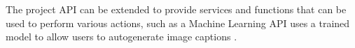 The project API can be extended to provide services and functions that
can be used to perform various actions, such as a Machine Learning API
uses a trained model to allow users to autogenerate image captions
\cite{hid-sp18-503-image-cap}.


 







